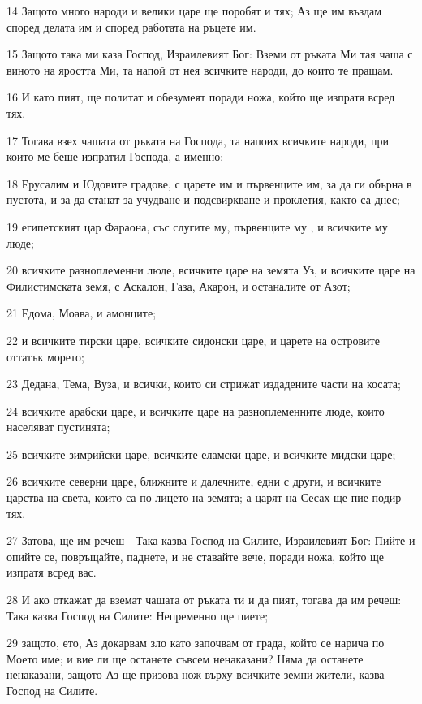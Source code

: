 \par 14 Защото много народи и велики царе ще поробят и тях; Аз ще им въздам според делата им и според работата на ръцете им.
\par 15 Защото така ми каза Господ, Израилевият Бог: Вземи от ръката Ми тая чаша с виното на яростта Ми, та напой от нея всичките народи, до които те пращам.
\par 16 И като пият, ще политат и обезумеят поради ножа, който ще изпратя всред тях.
\par 17 Тогава взех чашата от ръката на Господа, та напоих всичките народи, при които ме беше изпратил Господа, а именно:
\par 18 Ерусалим и Юдовите градове, с царете им и първенците им, за да ги обърна в пустота, и за да станат за учудване и подсвиркване и проклетия, както са днес;
\par 19 египетският цар Фараона, със слугите му, първенците му , и всичките му люде;
\par 20 всичките разноплеменни люде, всичките царе на земята Уз, и всичките царе на Филистимската земя, с Аскалон, Газа, Акарон, и останалите от Азот;
\par 21 Едома, Моава, и амонците;
\par 22 и всичките тирски царе, всичките сидонски царе, и царете на островите оттатък морето;
\par 23 Дедана, Тема, Вуза, и всички, които си стрижат издадените части на косата;
\par 24 всичките арабски царе, и всичките царе на разноплеменните люде, които населяват пустинята;
\par 25 всичките зимрийски царе, всичките еламски царе, и всичките мидски царе;
\par 26 всичките северни царе, ближните и далечните, едни с други, и всичките царства на света, които са по лицето на земята; а царят на Сесах ще пие подир тях.
\par 27 Затова, ще им речеш - Така казва Господ на Силите, Израилевият Бог: Пийте и опийте се, повръщайте, паднете, и не ставайте вече, поради ножа, който ще изпратя всред вас.
\par 28 И ако откажат да вземат чашата от ръката ти и да пият, тогава да им речеш: Така казва Господ на Силите: Непременно ще пиете;
\par 29 защото, ето, Аз докарвам зло като започвам от града, който се нарича по Моето име; и вие ли ще останете съвсем ненаказани? Няма да останете ненаказани, защото Аз ще призова нож върху всичките земни жители, казва Господ на Силите.
